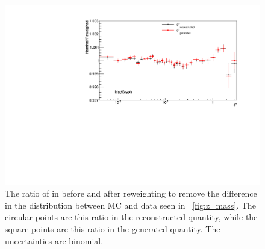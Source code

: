 \begin{figure}[!htbp]
    \centering
    \includegraphics[width=\textwidth]{figures/ZMass_reweighed.pdf}
    \caption[
        The ratio of \phistar in \MADGRAPH before and after reweighting to
        remove the differnce in the \mee distribution between MC and data.
    ]{
        The ratio of \phistar in \MADGRAPH before and after reweighting to
        remove the difference in the \mee distribution between MC and data seen
        in \FIG~\ref{fig:z_mass}. The circular points are this ratio in the
        reconstructed quantity, while the square points are this ratio in the
        generated quantity. The uncertainties are binomial.
    }
    \label{fig:z_mass_reweighted}
\end{figure}
